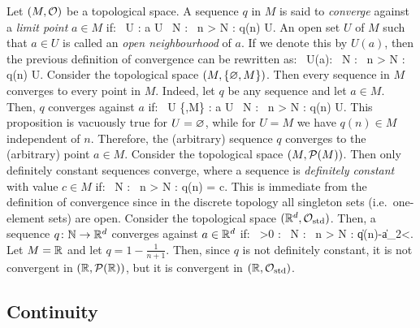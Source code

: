 \bd
Let $(M,\mathcal{O})$ be a topological space. A sequence $q$ in $M$ is said to \emph{converge} against a \emph{limit point} $a\in M$ if:
\bse
\forall \, U \in \cO : a \in U \imp \exists \, N \in \N : \forall \, n > N : q(n) \in U.
\ese
\ed
\br
An open set $U$ of $M$ such that $a\in U$ is called an \emph{open neighbourhood} of $a$. If we denote this by $U(a)$, then the previous definition of convergence can be rewritten as:
\bse
\forall \, U(a): \exists \, N \in \N : \forall \, n > N : q(n) \in U.
\ese
\er
\be
Consider the topological space $(M,\{\varnothing,M\})$. Then every sequence in $M$ converges to every point in $M$. Indeed, let $q$ be any sequence and let $a \in M$. Then, $q$ converges against $a$ if:
\bse
\forall \, U \in \{\vn,M\} : a \in U \imp \exists \, N \in \N : \forall \, n > N : q(n) \in U.
\ese
This proposition is vacuously true for $U=\varnothing$, while for $U=M$ we have $q(n)\in M$ independent of $n$. Therefore, the (arbitrary) sequence $q$ converges to the (arbitrary) point $a\in M$. 
\ee
\be
Consider the topological space $(M,\mathcal{P}(M))$. Then only definitely constant sequences converge, where a sequence is \emph{definitely constant} with value $c\in M$ if:
\bse
\exists \, N \in \N : \forall \, n > N : q(n) = c.
\ese
This is immediate from the definition of convergence since in the discrete topology all singleton sets (i.e.\ one-element sets) are open. 
\ee
\be
Consider the topological space $(\mathbb{R}^d,\mathcal{O}_\mathrm{std})$. Then, a sequence $q\colon \mathbb{N} \to \mathbb{R}^d$ converges against $a\in \mathbb{R}^d$ if:
\bse
\forall\, \ve >0 : \exists \, N \in \N : \forall \, n > N : \|q(n)-a\|_2<\ve.
\ese
\ee
\be
Let $M=\mathbb{R}$ and let $q=1-\frac{1}{n+1}$. Then, since $q$ is not definitely constant, it is not convergent in $(\mathbb{R},\mathcal{P}(\mathbb{R}))$, but it is convergent in $(\mathbb{R},\mathcal{O}_\mathrm{std})$.
\ee

\subsection{Continuity}

